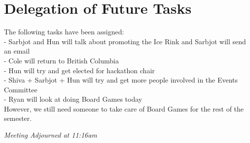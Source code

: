 \documentclass[12pt]{article}
\begin{document}
\section{Delegation of Future Tasks} \label{sec: Future}
\noindent The following tasks have been assigned: \\
- Sarbjot and Hun will talk about promoting the Ice Rink and Sarbjot will send an email \\
- Cole will return to British Columbia \\
- Hun will try and get elected for hackathon chair \\
-  Shiva + Sarbjot + Hun will try and get more people involved in the Events Committee \\
- Ryan will look at doing Board Games today \\

\noindent However, we still need someone to take care of Board Games for the rest of the semester.

\begin{center}
\em{Meeting Adjourned at 11:16am}
\end{center}
\end{document}
